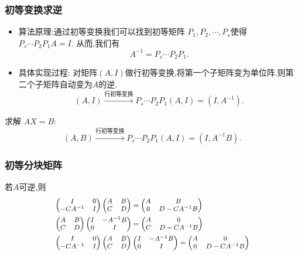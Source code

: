 \documentclass{article}
\renewcommand{\blue }[1]{{\textcolor[rgb]{0,0,1}{#1}}}
\begin{document}
\subsubsection{初等变换求逆}
\begin{itemize}
\item 算法原理:通过初等变换我们可以找到初等矩阵 $P_1,P_2,\cdots,P_s$使得
$P_s\cdots P_2P_1A=I$.  从而,我们有
\[A^{-1} =  P_s\cdots P_2P_1.\]
\item 具体实现过程: 对矩阵$(A,I)$做\blue{行}初等变换,将第一个子矩阵变为单位阵.则第二个子矩阵自动变为$A$的逆.
\[(A,I)\xrightarrow{\text{行初等变换}} P_s\cdots P_2P_1(A,I)=(I,A^{-1}).\]
\end{itemize}
求解 $AX=B$:
\[(A,B)\xrightarrow{\text{行初等变换}} P_s\cdots P_2P_1(A,I)=(I,A^{-1}B).\]

\subsubsection{初等分块矩阵}
若$A$可逆,则
\begin{equation*} \footnotesize
\begin{split}
&
\begin{pmatrix}I&0\\-CA^{-1}&I\end{pmatrix} \begin{pmatrix}A&B\\C&D\end{pmatrix} =\begin{pmatrix}A&B\\0&D-CA^{-1}B\end{pmatrix}\\
&
\begin{pmatrix}A&B\\C&D\end{pmatrix} \begin{pmatrix}I&-A^{-1}B\\0&I\end{pmatrix} =\begin{pmatrix}A&0\\C&D-CA^{-1}B\end{pmatrix}\\
&
\begin{pmatrix}I&0\\-CA^{-1}&I\end{pmatrix}\begin{pmatrix}A&B\\C&D\end{pmatrix} \begin{pmatrix}I&-A^{-1}B\\0&I\end{pmatrix} =\begin{pmatrix}A&0\\0&D-CA^{-1}B\end{pmatrix}\\
\end{split}
\end{equation*}
\end{document}
